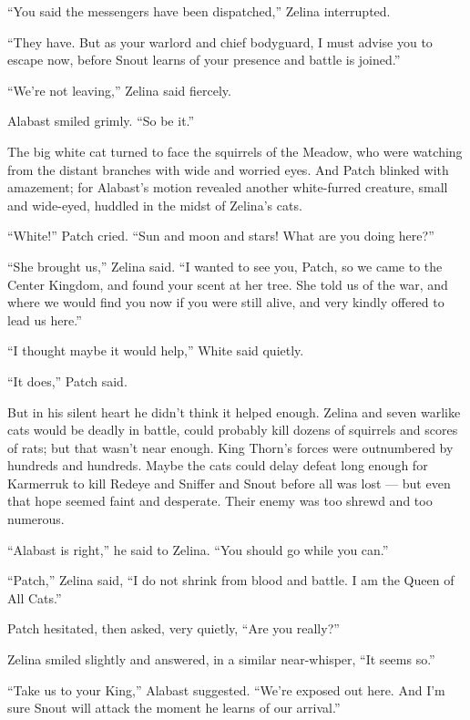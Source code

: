 \documentclass[ebook,oneside,openany,17pt]{memoir}
\newenvironment{tolerant}[1]{%
  \par\tolerance=#1\relax
}{%
  \par
}
\begin{document}
“You said the messengers have been dispatched,” Zelina interrupted.

“They have. But as your warlord and chief bodyguard, I must advise you
to escape now, before Snout learns of your presence and battle is
joined.”

“We’re not leaving,” Zelina said fiercely.

Alabast smiled grimly. “So be it.”

\begin{tolerant}{2000}
The big white cat turned to face the squirrels of the Meadow, who were
watching from the distant branches with wide and worried eyes. And
Patch blink\-ed with amazement; for Alabast’s motion revealed another
white-furred creature, small and wide-eyed, huddled in the midst of
Zelina’s cats.
\end{tolerant}

“White!” Patch cried. “Sun and moon and stars! What are you doing
here?”

“She brought us,” Zelina said. “I wanted to see you, Patch, so we came
to the Center Kingdom, and found your scent at her tree. She told us
of the war, and where we would find you now if you were still alive,
and very kindly offered to lead us here.”

“I thought maybe it would help,” White said quietly.

“It does,” Patch said.

\begin{tolerant}{500}
But in his silent heart he didn’t think it helped enough. Zelina and
seven warlike cats would be dead\-ly in battle, could probably kill
dozens of squirrels and scores of rats; but that wasn’t near
enough. King Thorn’s forces were outnumbered by hundreds and
hundreds. Maybe the cats could delay defeat long enough for Karmerruk
to kill Redeye and Sniffer and Snout before all was lost — but even
that hope seemed faint and desperate. Their enemy was too shrewd and
too numerous.
\end{tolerant}

“Alabast is right,” he said to Zelina. “You should go while you can.”

“Patch,” Zelina said, “I do not shrink from blood and battle. I am the
Queen of All Cats.”

Patch hesitated, then asked, very quietly, “Are you really?”

Zelina smiled slightly and answered, in a similar near-whisper, “It
seems so.”

“Take us to your King,” Alabast suggested. “We’re exposed out
here. And I’m sure Snout will attack the moment he learns of our
arrival.”
\end{document}
